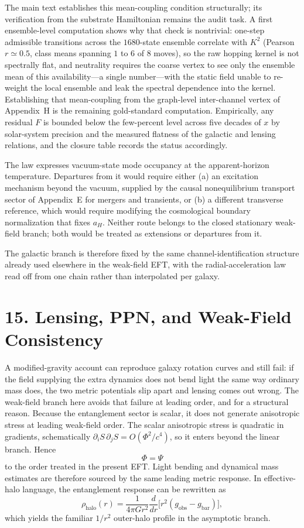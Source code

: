 \documentclass[11pt]{article}
\begin{document}
The main text establishes this mean-coupling condition structurally; its verification from the substrate Hamiltonian remains the audit task. A first ensemble-level computation shows why that check is nontrivial: one-step admissible transitions across the $1680$-state ensemble correlate with $K^2$ (Pearson $r\simeq0.5$, class means spanning $1$ to $6$ of $8$ moves), so the raw hopping kernel is not spectrally flat, and neutrality requires the coarse vertex to see only the ensemble mean of this availability---a single number---with the static field unable to re-weight the local ensemble and leak the spectral dependence into the kernel. Establishing that mean-coupling from the graph-level inter-channel vertex of Appendix~H is the remaining gold-standard computation. Empirically, any residual $F$ is bounded below the few-percent level across five decades of $x$ by solar-system precision and the measured flatness of the galactic and lensing relations, and the closure table records the status accordingly.

The law expresses vacuum-state mode occupancy at the apparent-horizon temperature. Departures from it would require either (a) an excitation mechanism beyond the vacuum, supplied by the causal nonequilibrium transport sector of Appendix~E for mergers and transients, or (b) a different transverse reference, which would require modifying the cosmological boundary normalization that fixes $a_H$. Neither route belongs to the closed stationary weak-field branch; both would be treated as extensions or departures from it.

The galactic branch is therefore fixed by the same channel-identification structure already used elsewhere in the weak-field EFT, with the radial-acceleration law read off from one chain rather than interpolated per galaxy.

\section{15. Lensing, PPN, and Weak-Field Consistency}

A modified-gravity account can reproduce galaxy rotation curves and still fail: if the field supplying the extra dynamics does not bend light the same way ordinary mass does, the two metric potentials slip apart and lensing comes out wrong. The weak-field branch here avoids that failure at leading order, and for a structural reason. Because the entanglement sector is scalar, it does not generate anisotropic stress at leading weak-field order. The scalar anisotropic stress is quadratic in gradients, schematically $\partial_iS\,\partial_jS=O(\Phi^2/c^4)$, so it enters beyond the linear branch. Hence
\[
\Phi=\Psi
\]
to the order treated in the present EFT. Light bending and dynamical mass estimates are therefore sourced by the same leading metric response. In effective-halo language, the entanglement response can be rewritten as
\[
\rho_{\mathrm{halo}}(r)=\frac{1}{4\pi Gr^2}\frac{d}{dr}\Big[r^2(g_{\mathrm{obs}}-g_{\mathrm{bar}})\Big],
\]
which yields the familiar $1/r^2$ outer-halo profile in the asymptotic branch.
\end{document}
